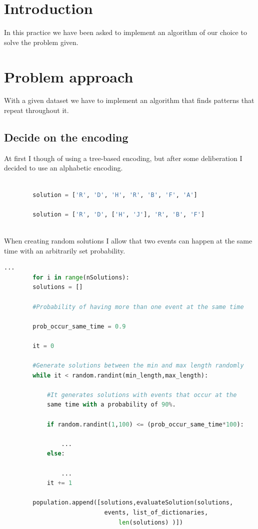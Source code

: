 \documentclass{article}
\begin{document}
    \newpage
    
    \section{Introduction}
    
    In this practice we have been asked to implement an algorithm of our choice to solve the problem given.
 
    \section{Problem approach}

    With a given dataset we have to implement an algorithm that finds patterns that repeat throughout it.

    \subsection{Decide on the encoding}

    At first I though of using a tree-based encoding, but after some deliberation I decided to use an alphabetic encoding.

    \begin{lstlisting}[language=Python]
        
        solution = ['R', 'D', 'H', 'R', 'B', 'F', 'A']
        
        solution = ['R', 'D', ['H', 'J'], 'R', 'B', 'F']
        
    \end{lstlisting}

    When creating random solutions I allow that two events can happen at the same time with an arbitrarily set probability. 

    \begin{lstlisting}[language=Python]
        ...
        for i in range(nSolutions):
        solutions = []
        
        #Probability of having more than one event at the same time

        prob_occur_same_time = 0.9

        it = 0

        #Generate solutions between the min and max length randomly
        while it < random.randint(min_length,max_length):
            
            #It generates solutions with events that occur at the 
            same time with a probability of 90%.

            if random.randint(1,100) <= (prob_occur_same_time*100):
                
                ...
            else:
               
                ...            
            it += 1

        population.append([solutions,evaluateSolution(solutions,
                            events, list_of_dictionaries, 
                                len(solutions) )])

    \end{lstlisting}
\end{document}
